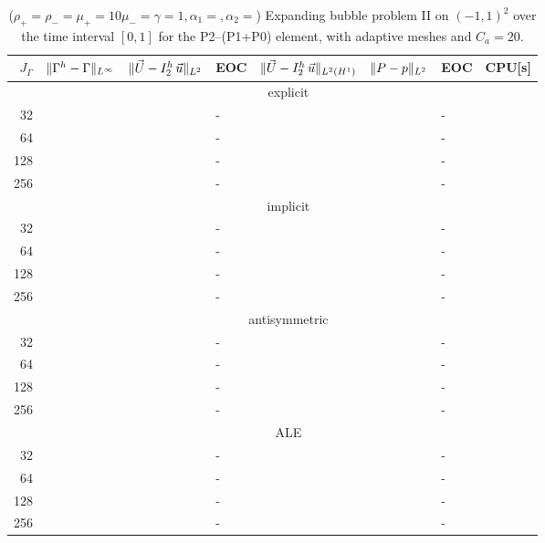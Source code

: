 \begin{table}
\center
\hspace*{-3.25cm}
\begin{tabular}{rllllllr}
\hline
$J_\Gamma$ & $\|\Gamma^h - \Gamma\|_{L^\infty}$ & $\|\vec U - I^h_{2}\,\vec u\|_{L^2}$ & EOC & $\|\vec U - I^h_{2}\,\vec u\|_{L^2(H^1)}$ & $\|P - p\|_{L^2}$ & EOC
& CPU[s] \\
\hline
& \multicolumn{7}{c}{explicit} \\
\hline
 32 & & & - & & & - & \\
 64 & & & - & & & - & \\
128 & & & - & & & - & \\
256 & & & - & & & - & \\
\hline
& \multicolumn{7}{c}{implicit} \\
\hline
 32 & & & - & & & - & \\
 64 & & & - & & & - & \\
128 & & & - & & & - & \\
256 & & & - & & & - & \\
\hline
& \multicolumn{7}{c}{antisymmetric} \\
\hline
 32 & & & - & & & - & \\
 64 & & & - & & & - & \\
128 & & & - & & & - & \\
256 & & & - & & & - & \\
\hline
& \multicolumn{7}{c}{ALE} \\
\hline
 32 & & & - & & & - & \\
 64 & & & - & & & - & \\
128 & & & - & & & - & \\
256 & & & - & & & - & \\
\hline
\end{tabular}
\hspace*{-3.25cm}
\caption[Navier--Stokes expanding bubble II errors P2--(P1+P0)]
{($\rho_+ = \rho_- = \mu_+ = 10\mu_- = \gamma = 1,\alpha_1=,\alpha_2=$)
Expanding bubble problem II on $(-1,1)^2$ over the time interval $[0,1]$ for
the P2--(P1+P0) element, with adaptive meshes and $C_a=20$\textdegree.}
\label{tab:nsexpandingbubbleIIp2p1p0}
\end{table}

